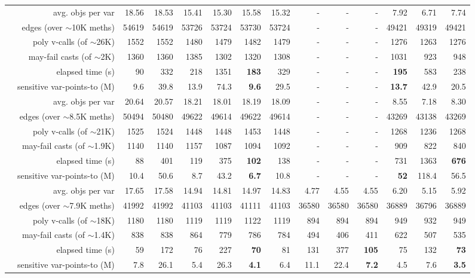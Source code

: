 \begin{table}
{\begin{tabular} {|c|r|r|r!{\vrule width 2pt}r|r|r|r!{\vrule width 2pt}r|r|r!{\vrule width 2pt}r|r|r|}
& avg. objs per var            & 18.56 & 18.53 & 15.41 & 15.30 & 15.58 & 15.32 & - &   -   & - & 7.92  & 6.71  & 7.74 \\
& edges (over $\sim$10K meths) & 54619 & 54619 & 53726 & 53724 & 53730 & 53724 & - &   -   & - & 49421 & 49319 & 49421 \\
& poly v-calls (of $\sim$26K)  &  1552 &  1552 & 1480  & 1479  &  1482 & 1479  & - &   -   & - & 1276  & 1263  & 1276 \\
& may-fail casts (of $\sim$2K) &  1360 &  1360 &  1385 &  1302 &  1320 &  1308 & - &   -   & - & 1031  & 923   & 948 \\
& elapsed time (s)             &    90 &   332 &   218 &  1351 & {\bf 183} &   329 & - &   -   & - & {\bf 195}   & 583   & 238 \\
& sensitive var-points-to (M)  &  9.6    &    39.8 &    13.9 &    74.3 & {\bf   9.6} &    29.5 & - &   -   & - & {\bf  13.7} &    42.9 & 20.5 \\

& avg. objs per var          & 20.64 & 20.57 & 18.21 & 18.01 & 18.19 & 18.09 & - & - & - & 8.55 & 7.18 & 8.30 \\
& edges (over $\sim$8.5K meths) & 50494 & 50480 & 49622 & 49614 & 49622 & 49614 & - & - & - & 43269 & 43138 & 43269 \\
& poly v-calls (of $\sim$21K)   & 1525 & 1524 & 1448 & 1448 & 1453 & 1448 & - & - & - & 1268 & 1236 & 1268 \\
& may-fail casts (of $\sim$1.9K)     & 1140 & 1140 & 1157 & 1087 & 1094 & 1092 & - & - & - & 909 & 822 & 840 \\
& elapsed time (s)           & 88 & 401 & 119 & 375 & {\bf 102} & 138 & - & - & - & 731 & 1363 & {\bf 676} \\
& sensitive var-points-to (M)    & 10.4 & 50.6 & 8.7 & 43.2 & {\bf 6.7} & 10.8 & - & - & - & {\bf 52} & 118.4 & 56.5 \\

& avg. objs per var          & 17.65 & 17.58 & 14.94 & 14.81 & 14.97 & 14.83 & 4.77 & 4.55 & 4.55 & 6.20 & 5.15 & 5.92 \\
& edges (over $\sim$7.9K meths) & 41992 & 41992 & 41103 & 41103 & 41111 & 41103 & 36580 & 36580 & 36580 & 36889 & 36796 & 36889 \\
& poly v-calls (of $\sim$18K)   & 1180 & 1180 & 1119 & 1119 & 1122 & 1119 & 894 & 894 & 894 & 949 & 932 & 949 \\
& may-fail casts (of $\sim$1.4K)     & 838 & 838 & 864 & 779 & 786 & 784 & 494 & 406 & 411 & 622 & 507 & 535 \\
& elapsed time (s)           & 59 & 172 & 76 & 227 & {\bf 70} & 81 & 131 & 377 & {\bf 105} & 75 & 132 & {\bf 73} \\
& sensitive var-points-to (M)    & 7.8 & 26.1 & 5.4 & 26.3 & {\bf 4.1} & 6.4 & 11.1 & 22.4 & {\bf 7.2} & 4.5 & 7.6 & {\bf 3.5} \\


\end{tabular}}
\end{table}
